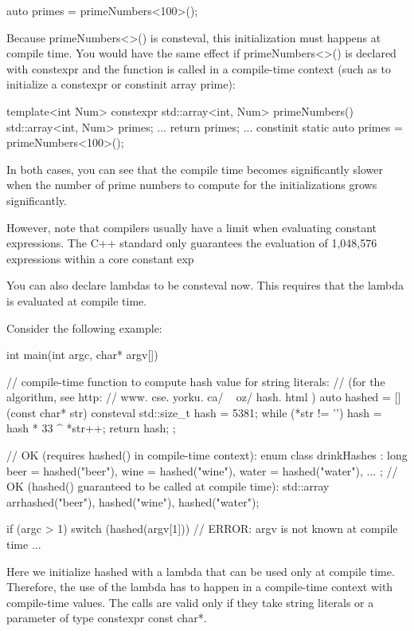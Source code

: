 \begin{cpp}
auto primes = primeNumbers<100>();
\end{cpp}

Because primeNumbers<>() is consteval, this initialization must happens at compile time. You would have the same effect if primeNumbers<>() is declared with constexpr and the function is called in a compile-time context (such as to initialize a constexpr or constinit array prime):

\begin{cpp}
template<int Num>
constexpr
std::array<int, Num> primeNumbers()
{
	std::array<int, Num> primes;
	...
	return primes;
}
...
constinit static auto primes = primeNumbers<100>();
\end{cpp}

In both cases, you can see that the compile time becomes significantly slower when the number of prime numbers to compute for the initializations grows significantly.

However, note that compilers usually have a limit when evaluating constant expressions. The C++ standard only guarantees the evaluation of 1,048,576 expressions within a core constant exp



You can also declare lambdas to be consteval now. This requires that the lambda is evaluated at compile time.

Consider the following example:

\begin{cpp}
int main(int argc, char* argv[])
{
	// compile-time function to compute hash value for string literals:
	// (for the algorithm, see http: // www. cse. yorku. ca/ ~ oz/ hash. html )
	auto hashed = [] (const char* str) consteval {
					std::size_t hash = 5381;
					while (*str != '\0') {
						hash = hash * 33 ^ *str++;
					}
					return hash;
				};
	
	// OK (requires hashed() in compile-time context):
	enum class drinkHashes : long { beer = hashed("beer"), wine = hashed("wine"),
									water = hashed("water"), ... };
	// OK (hashed() guaranteed to be called at compile time):
	std::array arr{hashed("beer"), hashed("wine"), hashed("water")};
	
	if (argc > 1) {
		switch (hashed(argv[1])) { // ERROR: argv is not known at compile time
			...
		}
	}
}
\end{cpp}

Here we initialize hashed with a lambda that can be used only at compile time. Therefore, the use of the lambda has to happen in a compile-time context with compile-time values. The calls are valid only if they take string literals or a parameter of type constexpr const char*.

